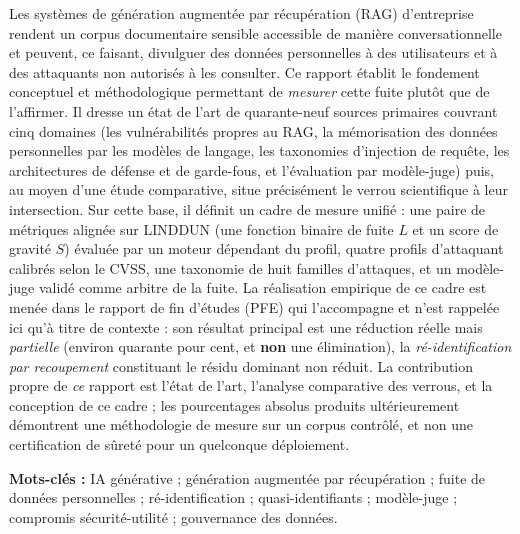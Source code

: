 \documentclass[12pt,a4paper]{report}
\begin{document}
\noindent Les systèmes de génération augmentée par récupération (RAG) d'entreprise rendent un corpus
documentaire sensible accessible de manière conversationnelle et peuvent, ce faisant, divulguer des
données personnelles à des utilisateurs et à des attaquants non autorisés à les consulter. Ce rapport
établit le fondement conceptuel et méthodologique permettant de \emph{mesurer} cette fuite plutôt que
de l'affirmer. Il dresse un état de l'art de quarante-neuf sources primaires couvrant cinq domaines
(les vulnérabilités propres au RAG, la mémorisation des données personnelles par les modèles de langage,
les taxonomies d'injection de requête, les architectures de défense et de garde-fous, et l'évaluation
par modèle-juge) puis, au moyen d'une étude comparative, situe précisément le verrou scientifique à
leur intersection. Sur cette base, il définit un cadre de mesure unifié : une paire de métriques alignée
sur LINDDUN (une fonction binaire de fuite $L$ et un score de gravité $S$) évaluée par un moteur
dépendant du profil, quatre profils d'attaquant calibrés selon le CVSS, une taxonomie de huit familles
d'attaques, et un modèle-juge validé comme arbitre de la fuite. La réalisation empirique de ce cadre est
menée dans le rapport de fin d'études (PFE) qui l'accompagne et n'est rappelée ici qu'à titre de
contexte : son résultat principal est une réduction réelle mais \emph{partielle} (environ quarante pour
cent, et \textbf{non} une élimination), la \emph{ré-identification par recoupement} constituant le résidu
dominant non réduit. La contribution propre de \emph{ce} rapport est l'état de l'art, l'analyse
comparative des verrous, et la conception de ce cadre ; les pourcentages absolus produits ultérieurement
démontrent une méthodologie de mesure sur un corpus contrôlé, et non une certification de sûreté pour un
quelconque déploiement.

\medskip
\noindent\textbf{Mots-clés :} IA générative ; génération augmentée par récupération ; fuite de données
personnelles ; ré-identification ; quasi-identifiants ; modèle-juge ; compromis sécurité-utilité ;
gouvernance des données.

\end{document}
